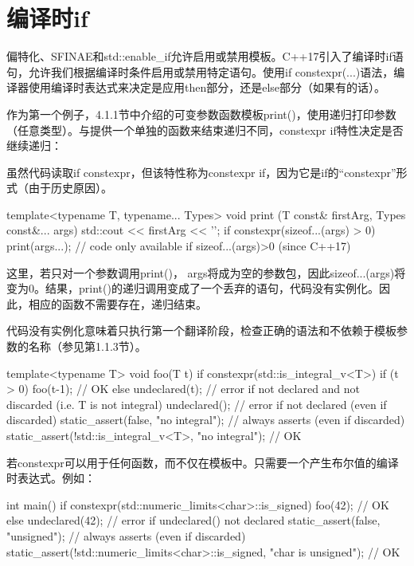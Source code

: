 \section{编译时if}
偏特化、SFINAE和std::enable\_if允许启用或禁用模板。C++17引入了编译时if语句，允许我们根据编译时条件启用或禁用特定语句。使用if constexpr(...)语法，编译器使用编译时表达式来决定是应用then部分，还是else部分（如果有的话）。

作为第一个例子，4.1.1节中介绍的可变参数函数模板print()，使用递归打印参数（任意类型）。与提供一个单独的函数来结束递归不同，constexpr if特性决定是否继续递归：

\begin{notice}
虽然代码读取if constexpr，但该特性称为constexpr if，因为它是if的“constexpr”形式（由于历史原因）。
\end{notice}

\begin{cpp}
template<typename T, typename... Types>
void print (T const& firstArg, Types const&... args)
{
	std::cout << firstArg << '\n';
	if constexpr(sizeof...(args) > 0) {
		print(args...); // code only available if sizeof...(args)>0 (since C++17)
	}
}
\end{cpp}

这里，若只对一个参数调用print()， args将成为空的参数包，因此sizeof...(args)将变为0。结果，print()的递归调用变成了一个丢弃的语句，代码没有实例化。因此，相应的函数不需要存在，递归结束。

代码没有实例化意味着只执行第一个翻译阶段，检查正确的语法和不依赖于模板参数的名称（参见第1.1.3节）。

\begin{cpp}
template<typename T>
void foo(T t)
{
	if constexpr(std::is_integral_v<T>) {
		if (t > 0) {
			foo(t-1); // OK
		}
	}
	else {
		undeclared(t); // error if not declared and not discarded (i.e. T is not integral)
		undeclared(); // error if not declared (even if discarded)
		static_assert(false, "no integral"); // always asserts (even if discarded)
		static_assert(!std::is_integral_v<T>, "no integral"); // OK
	}
}
\end{cpp}

若constexpr可以用于任何函数，而不仅在模板中。只需要一个产生布尔值的编译时表达式。例如：

\begin{cpp}
int main()
{
	if constexpr(std::numeric_limits<char>::is_signed) {
		foo(42); // OK
	}
	else {
		undeclared(42); // error if undeclared() not declared
		static_assert(false, "unsigned"); // always asserts (even if discarded)
		static_assert(!std::numeric_limits<char>::is_signed,
		"char is unsigned"); // OK
	}
}
\end{cpp}

